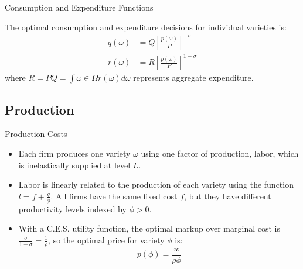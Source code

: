 \documentclass[aspectratio=169]{beamer}
\begin{document}

\begin{frame}{Consumption and Expenditure Functions}

The optimal consumption and expenditure decisions for individual varieties is:
\begin{equation}
    \begin{split}
        q\left( \omega \right) &= Q\left[ \frac{p\left( \omega \right)}{P} \right]^{-\sigma} \\
        r\left( \omega \right) &= R\left[ \frac{p\left( \omega \right)}{P} \right]^{1 - \sigma}
    \end{split}
    \label{eq:quantityandexpenditure}
\end{equation}
where $ R = PQ = \int{\omega \in \Omega} r\left( \omega \right) d\omega $ represents aggregate expenditure.
    
\end{frame}


\subsection{Production}


\begin{frame}{Production Costs}

\begin{itemize}
    \item<1-> Each firm produces one variety $ \omega $ using one factor of production, labor, which is inelastically supplied at level $ L $.
    \item<2-> Labor is linearly related to the production of each variety using the function $ l = f + \frac{q}{\phi} $.  All firms have the same fixed cost $ f $, but they have different productivity levels indexed by $ \phi > 0 $. 
    \item<3-> With a C.E.S. utility function, the optimal markup over marginal cost is $ \frac{\sigma}{1 - \sigma} = \frac{1}{\rho} $, so the optimal price for variety $ \phi $ is:
    \begin{equation}
        p\left( \phi \right) = \frac{w}{\rho \phi}
        \label{eq:optimalprice}
    \end{equation}
\end{itemize}
    
\end{frame}
\end{document}
